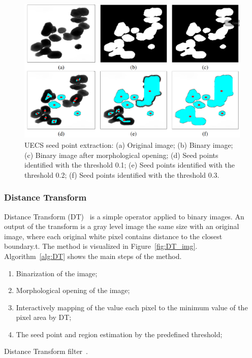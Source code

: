 \documentclass{lutmscthesis}[2010/09/22]
\begin{document}
\begin{figure} [ht]
  \includegraphics[width=\linewidth]{UECS.png}
  \caption{UECS seed point extraction: (a) Original image; 
    (b) Binary image; 
    (c) Binary image after morphological opening; 
    (d) Seed points identified with the threshold 0.1;
    (e) Seed points identified with the threshold 0.2;
    (f) Seed points identified with the threshold 0.3.~\cite{zafari-thesis}}
  \label{fig:UECS-alg}
\end{figure}

\subsubsection{Distance Transform}

Distance Transform (DT)~\cite{DT} is a simple operator applied to binary images. An output of the transform is a gray level image the same size with an original image, where each original white pixel contains distance to the closest boundary.t.
The method is visualized in Figure~\ref{fig:DT_img}. Algorithm~\ref{alg:DT} shows the main steps of the method.

\begin{algorithm} [H]
   \begin{enumerate}
        \item Binarization of the image;
        \item Morphological opening of the image;
        \item Interactively mapping of the value each pixel to the minimum value of the pixel area by DT;
        \item The seed point and region estimation by the predefined threshold;
    \end{enumerate}
    \caption{Distance Transform filter~\cite{DT-bactery}.}\label{alg:DT}
\end{algorithm}
\end{document}
